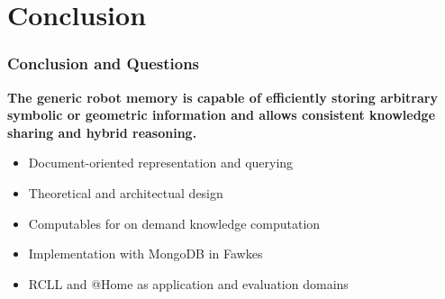 \section{Conclusion}
\begin{frame}
  \frametitle{Conclusion and Questions}

  \begin{block}{} \centering\bfseries The generic robot memory is capable of
    efficiently storing arbitrary symbolic or geometric information
    and allows consistent knowledge sharing and hybrid reasoning.
  \end{block}

  \bigskip

  \begin{itemize}
  \item Document-oriented representation and querying
  \item Theoretical and architectual design
  \item Computables for on demand knowledge computation
  \item Implementation with MongoDB in Fawkes
  \item RCLL and @Home as application and evaluation domains
  \end{itemize}
\end{frame}


